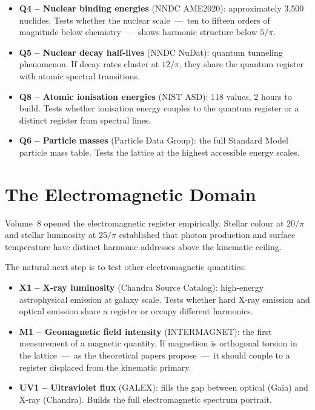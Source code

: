 \documentclass[11pt, letterpaper, openany]{book}
\begin{document}
\begin{itemize}
\item \textbf{Q4 -- Nuclear binding energies} (NNDC AME2020): approximately 3,500
      nuclides. Tests whether the nuclear scale~---~ten to fifteen orders of
      magnitude below chemistry~---~shows harmonic structure below $5/\pi$.
\item \textbf{Q5 -- Nuclear decay half-lives} (NNDC NuDat): quantum tunneling
      phenomenon. If decay rates cluster at $12/\pi$, they share the quantum
      register with atomic spectral transitions.
\item \textbf{Q8 -- Atomic ionisation energies} (NIST ASD): 118 values, 2 hours
      to build. Tests whether ionisation energy couples to the quantum register
      or a distinct register from spectral lines.
\item \textbf{Q6 -- Particle masses} (Particle Data Group): the full Standard
      Model particle mass table. Tests the lattice at the highest accessible
      energy scales.
\end{itemize}

\section{The Electromagnetic Domain}

Volume~8 opened the electromagnetic register empirically. Stellar colour at $20/\pi$
and stellar luminosity at $25/\pi$ established that photon production and surface
temperature have distinct harmonic addresses above the kinematic ceiling.

The natural next step is to test other electromagnetic quantities:

\begin{itemize}
\item \textbf{X1 -- X-ray luminosity} (Chandra Source Catalog): high-energy
      astrophysical emission at galaxy scale. Tests whether hard X-ray emission
      and optical emission share a register or occupy different harmonics.
\item \textbf{M1 -- Geomagnetic field intensity} (INTERMAGNET): the first
      measurement of a magnetic quantity. If magnetism is orthogonal torsion in
      the lattice~---~as the theoretical papers propose~---~it should couple to
      a register displaced from the kinematic primary.
\item \textbf{UV1 -- Ultraviolet flux} (GALEX): fills the gap between optical
      (Gaia) and X-ray (Chandra). Builds the full electromagnetic spectrum portrait.
\end{itemize}
\end{document}
